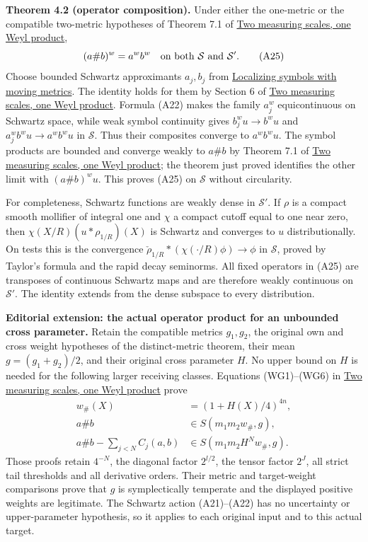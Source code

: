 \documentclass[
  11pt,
]{article}
\begin{document}
\textbf{Theorem 4.2 (operator composition).} Under either the one-metric
or the compatible two-metric hypotheses of Theorem 7.1 of
\href{weyl-metric-products.pdf}{Two measuring scales, one Weyl product},
\[
(a\#b)^w=a^wb^w
\quad\hbox{on both }\mathcal S\hbox{ and }\mathcal S'.
\tag{A25}
\] Choose bounded Schwartz approximants \(a_j,b_j\) from
\href{metric-localization.pdf}{Localizing symbols with moving metrics}.
The identity holds for them by Section 6 of
\href{weyl-metric-products.pdf}{Two measuring scales, one Weyl product}.
Formula (A22) makes the family \(a_j^w\) equicontinuous on Schwartz
space, while weak symbol continuity gives \(b_j^wu\to b^wu\) and
\(a_j^wb^wu\to a^wb^wu\) in \(\mathcal S\). Thus their composites
converge to \(a^wb^wu\). The symbol products are bounded and converge
weakly to \(a\#b\) by Theorem 7.1 of \href{weyl-metric-products.pdf}{Two
measuring scales, one Weyl product}; the theorem just proved identifies
the other limit with \((a\#b)^wu\). This proves (A25) on \(\mathcal S\)
without circularity.

For completeness, Schwartz functions are weakly dense in
\(\mathcal S'\). If \(\rho\) is a compact smooth mollifier of integral
one and \(\chi\) a compact cutoff equal to one near zero, then
\(\chi(X/R)(u*\rho_{1/R})(X)\) is Schwartz and converges to \(u\)
distributionally. On tests this is the convergence
\(\check\rho_{1/R}*(\chi(\cdot/R)\phi)\to\phi\) in \(\mathcal S\),
proved by Taylor's formula and the rapid decay seminorms. All fixed
operators in (A25) are transposes of continuous Schwartz maps and are
therefore weakly continuous on \(\mathcal S'\). The identity extends
from the dense subspace to every distribution.

\textbf{Editorial extension: the actual operator product for an
unbounded cross parameter.} Retain the compatible metrics \(g_1,g_2\),
the original own and cross weight hypotheses of the distinct-metric
theorem, their mean \(g=(g_1+g_2)/2\), and their original cross
parameter \(H\). No upper bound on \(H\) is needed for the following
larger receiving classes. Equations (WG1)--(WG6) in
\href{weyl-metric-products.pdf}{Two measuring scales, one Weyl product}
prove \[
\begin{aligned}
w_\#(X)&=(1+H(X)/4)^{4n},\\
a\#b&\in S(m_1m_2w_\#,g),\\
a\#b-\sum_{j<N}C_j(a,b)&\in S(m_1m_2H^Nw_\#,g).
\end{aligned}
\tag{AO1}
\] Those proofs retain \(4^{-N}\), the diagonal factor \(2^{l/2}\), the
tensor factor \(2^J\), all strict tail thresholds and all derivative
orders. Their metric and target-weight comparisons prove that \(g\) is
symplectically temperate and the displayed positive weights are
legitimate. The Schwartz action (A21)--(A22) has no uncertainty or
upper-parameter hypothesis, so it applies to each original input and to
this actual target.
\end{document}
